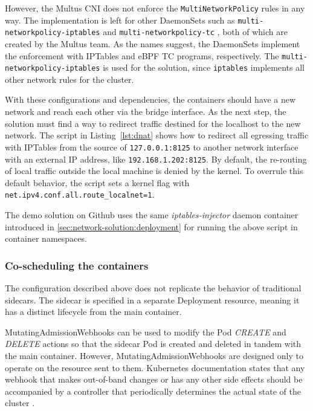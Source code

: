 \documentclass[english, 12pt, a4paper, sci, utf8, a-2b, online]{aaltothesis}
\begin{document}
However, the Multus CNI does not enforce the \texttt{MultiNetworkPolicy} rules in any way.
The implementation is left for other DaemonSets such as \texttt{multi-networkpolicy-iptables} \cite{multi-network-policy-iptables} and \texttt{multi-networkpolicy-tc} \cite{multi-network-policy-tc}, both of which are created by the Multus team.
As the names suggest, the DaemonSets implement the enforcement with IPTables and eBPF TC programs, respectively.
The \texttt{multi-networkpolicy-iptables} is used for the solution, since \texttt{iptables} implements all other network rules for the cluster.


With these configurations and dependencies, the containers should have a new network and reach each other via the bridge interface.
As the next step, the solution must find a way to redirect traffic destined for the localhost to the new network.
The script in Listing~\ref{lst:dnat} shows how to redirect all egressing traffic with IPTables from the source of \texttt{127.0.0.1:8125} to another network interface with an external IP address, like \texttt{192.168.1.202:8125}.
By default, the re-routing of local traffic outside the local machine is denied by the kernel.
To overrule this default behavior, the script sets a kernel flag with \lstinline{net.ipv4.conf.all.route_localnet=1}.



The demo solution on Github uses the same \emph{iptables-injector} daemon container introduced in \ref{sec:network-solution:deployment} for running the above script in container namespaces.

\subsubsection{Co-scheduling the containers}

The configuration described above does not replicate the behavior of traditional sidecars.
The sidecar is specified in a separate Deployment resource, meaning it has a distinct lifecycle from the main container.

MutatingAdmissionWebhooks can be used to modify the Pod \emph{CREATE} and \emph{DELETE} actions so that the sidecar Pod is created and deleted in tandem with the main container.
However, MutatingAdmissionWebhooks are designed only to operate on the resource sent to them.
Kubernetes documentation states that any webhook that makes out-of-band changes or has any other side effects should be accompanied by a controller that periodically determines the actual state of the cluster \cite{k8s-docs-dac}.
\end{document}
